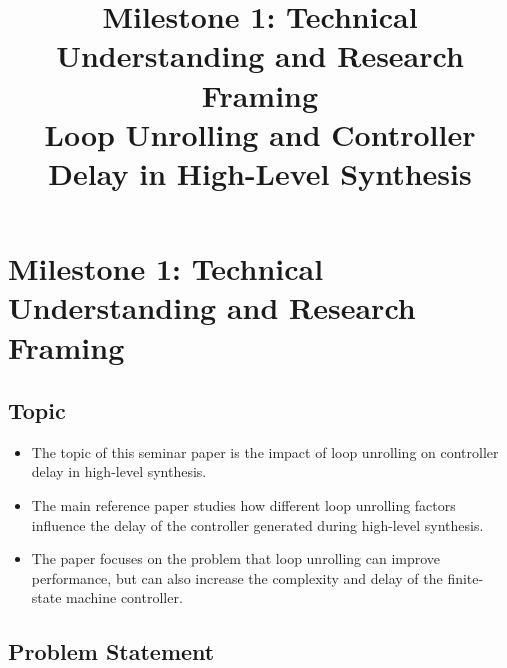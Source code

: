 \documentclass[conference]{IEEEtran}
\begin{document}
\title{Milestone 1: Technical Understanding and Research Framing\\
Loop Unrolling and Controller Delay in High-Level Synthesis}

\author{
}

\maketitle

\section{Milestone 1: Technical Understanding and Research Framing}

\subsection{Topic}

\begin{itemize}
    \item The topic of this seminar paper is the impact of loop unrolling on controller delay in high-level synthesis.
    \item The main reference paper studies how different loop unrolling factors influence the delay of the controller generated during high-level synthesis.
    \item The paper focuses on the problem that loop unrolling can improve performance, but can also increase the complexity and delay of the finite-state machine controller.
\end{itemize}

\subsection{Problem Statement}
\end{document}
